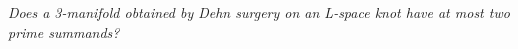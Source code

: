\documentclass[12pt]{amsart}
\begin{document}
{\it Does a 3-manifold obtained by Dehn surgery on an L-space knot have at most two prime summands?}
\end{document}

